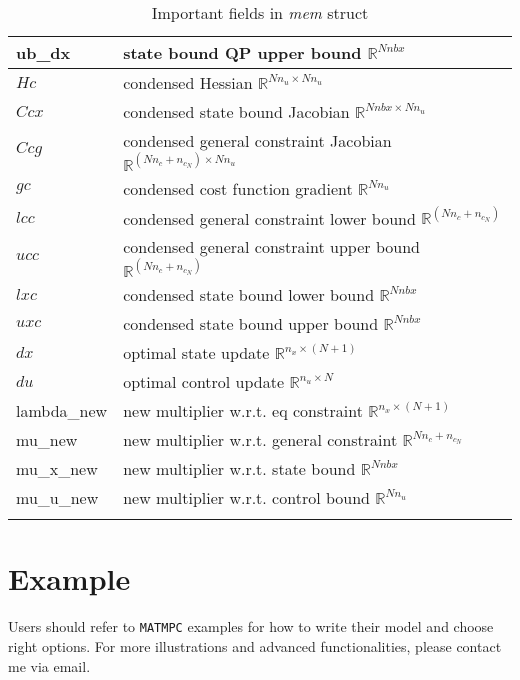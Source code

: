 \documentclass{article}
\newcommand{\software}[1]{{\tt#1}}
\newcommand{\alert}[1]{{\textit{#1}}}
\begin{document}
\begin{longtable}{l|l}
		ub\_dx & state bound QP upper bound     $\mathbb{R}^{Nnbx}$           \\\hline
		$Hc$ & condensed Hessian    $\mathbb{R}^{Nn_u\times Nn_u}$                     \\
		$Ccx$ & condensed state bound Jacobian  $\mathbb{R}^{Nnbx\times Nn_u}$          \\
		$Ccg$ & condensed general constraint Jacobian  $\mathbb{R}^{(Nn_c+n_{c_N})\times Nn_u}$    \\
		$gc$ & condensed cost function gradient  $\mathbb{R}^{Nn_u}$        \\
		$lcc$ & condensed general constraint lower bound $\mathbb{R}^{(Nn_c+n_{c_N})}$ \\
		$ucc$ & condensed general constraint upper bound $\mathbb{R}^{(Nn_c+n_{c_N})}$ \\
		$lxc$ & condensed state bound lower bound   $\mathbb{R}^{Nnbx}$      \\
		$uxc$ & condensed state bound upper bound   $\mathbb{R}^{Nnbx}$      \\\hline
		$dx$ & optimal state update     $\mathbb{R}^{n_x\times (N+1)}$                 \\
		$du$ & optimal control update   $\mathbb{R}^{n_u\times N}$                 \\
		lambda\_new & new multiplier w.r.t. eq constraint $\mathbb{R}^{n_x\times (N+1)}$      \\
		mu\_new & new multiplier w.r.t. general constraint  $\mathbb{R}^{Nn_c+n_{c_N}}$ \\
		mu\_x\_new & new multiplier w.r.t. state bound  $\mathbb{R}^{Nnbx}$       \\
		mu\_u\_new & new multiplier w.r.t. control bound  $\mathbb{R}^{Nn_u}$     \\
		\hline
	\caption{Important fields in \alert{mem} struct}
	\label{table:mem}
\end{longtable}

\section{Example}
Users should refer to \software{MATMPC} examples for how to write their model and choose right options. For more illustrations and advanced functionalities, please contact me via email.



\end{document}

